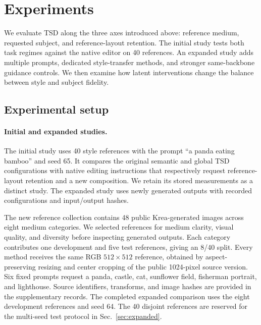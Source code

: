 \section{Experiments}
\label{sec:experiments}
We evaluate TSD along the three axes introduced above: reference medium,
requested subject, and reference-layout retention. The initial study tests
both task regimes against the native editor on 40 references. An expanded
study adds multiple prompts, dedicated style-transfer methods, and stronger
same-backbone guidance controls. We then examine how latent interventions
change the balance between style and subject fidelity.

\subsection{Experimental setup}
\label{sec:setup}
\paragraph{Initial and expanded studies.}
The initial study uses 40 style references with the prompt ``a panda eating
bamboo'' and seed 65. It compares the original semantic and global TSD
configurations with native editing instructions that respectively request
reference-layout retention and a new composition. We retain its stored
measurements as a distinct study. The expanded study uses newly generated
outputs with recorded configurations and input/output hashes.

The new reference collection contains 48 public Krea-generated images across
eight medium categories. We selected references for medium clarity, visual
quality, and diversity before inspecting generated outputs. Each category
contributes one development and five test references, giving an 8/40 split.
Every method receives the same RGB $512\times512$ reference, obtained by
aspect-preserving resizing and center cropping of the public 1024-pixel
source version. Six fixed prompts request a panda, castle, cat, sunflower
field, fisherman portrait, and lighthouse. Source identifiers, transforms,
and image hashes are provided in the supplementary records. The completed
expanded comparison uses the eight development references and seed 64.
The 40 disjoint references are reserved for the multi-seed test protocol
in Sec.~\ref{sec:expanded}.

